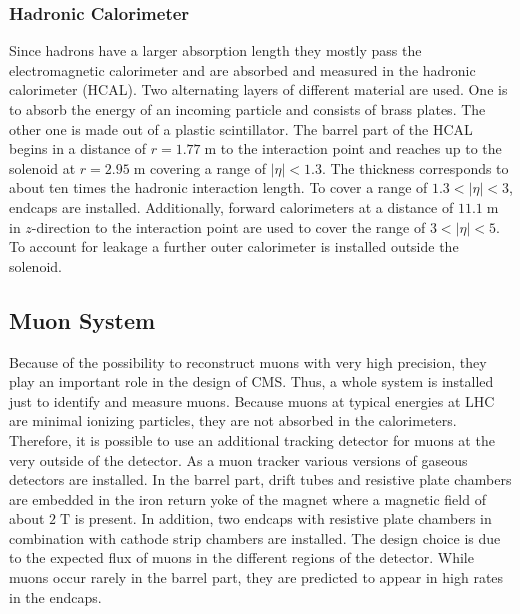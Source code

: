 \subsubsection{Hadronic Calorimeter}
	Since hadrons have a larger absorption length they mostly pass the electromagnetic calorimeter and are absorbed and measured in the hadronic calorimeter (HCAL). Two alternating layers of different material are used. One is to absorb the energy of an incoming particle and consists of brass plates. The other one is made out of a plastic scintillator. The barrel part of the HCAL begins in a distance of $r=1.77\;\text{m}$ to the interaction point and reaches up to the solenoid at $r=2.95\;\text{m}$ covering a range of $|\eta| < 1.3$. The thickness corresponds to about ten times the hadronic interaction length. To cover a range of $1.3 < |\eta| < 3$, endcaps are installed. Additionally, forward calorimeters at a distance of $11.1\;\text{m}$ in $z$-direction to the interaction point are used to cover the range of $3 < |\eta| < 5$. To account for leakage a further outer calorimeter is installed outside the solenoid. 

 
\subsection{Muon System}
\label{sec:muonsystem}
	Because of the possibility to reconstruct muons with very high precision, they play an important role in the design of CMS. Thus, a whole system is installed just to identify and measure muons. Because muons at typical energies at LHC are minimal ionizing particles, they are not absorbed in the calorimeters. Therefore, it is possible to use an additional tracking detector for muons at the very outside of the detector. As a muon tracker various versions of gaseous detectors are installed. In the barrel part, drift tubes and resistive plate chambers are embedded in the iron return yoke of the magnet where a magnetic field of about $2\;\text{T}$ is present. In addition, two endcaps with resistive plate chambers in combination with cathode strip chambers are installed. The design choice is due to the expected flux of muons in the different regions of the detector. While muons occur rarely in the barrel part, they are predicted to appear in high rates in the endcaps.

